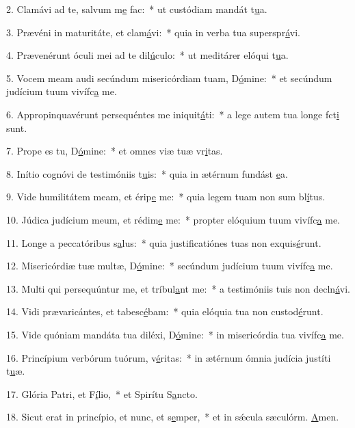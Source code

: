 2. Clamávi ad te, salvum m\uline{e} fac:~* ut custódiam mandát t\uline{u}a.\par 
3. Prævéni in maturitáte, et clam\uline{á}vi:~* quia in verba tua superspr\uline{á}vi.\par 
4. Prævenérunt óculi mei ad te dil\uline{ú}culo:~* ut meditárer elóqui t\uline{u}a.\par 
5. Vocem meam audi secúndum misericórdiam tuam, D\uline{ó}mine:~* et secúndum judícium tuum vivífc\uline{a} me.\par 
6. Appropinquavérunt persequéntes me iniquit\uline{á}ti:~* a lege autem tua longe fct\uline{i} sunt.\par 
7. Prope es tu, D\uline{ó}mine:~* et omnes viæ tuæ vr\uline{i}tas.\par 
8. Inítio cognóvi de testimóniis t\uline{u}is:~* quia in ætérnum fundást \uline{e}a.\par 
9. Vide humilitátem meam, et érip\uline{e} me:~* quia legem tuam non sum bl\uline{í}tus.\par 
10. Júdica judícium meum, et rédim\uline{e} me:~* propter elóquium tuum vivífc\uline{a} me.\par 
11. Longe a peccatóribus s\uline{a}lus:~* quia justificatiónes tuas non exquis\uline{é}runt.\par 
12. Misericórdiæ tuæ multæ, D\uline{ó}mine:~* secúndum judícium tuum vivífc\uline{a} me.\par 
13. Multi qui persequúntur me, et tríbul\uline{a}nt me:~* a testimóniis tuis non decln\uline{á}vi.\par 
14. Vidi prævaricántes, et tabesc\uline{é}bam:~* quia elóquia tua non custod\uline{é}runt.\par 
15. Vide quóniam mandáta tua diléxi, D\uline{ó}mine:~* in misericórdia tua vivífc\uline{a} me.\par 
16. Princípium verbórum tuórum, v\uline{é}ritas:~* in ætérnum ómnia judícia justíti t\uline{u}æ.\par 
17. Glória Patri, et F\uline{í}lio,~* et Spirítu S\uline{a}ncto.\par 
18. Sicut erat in princípio, et nunc, et s\uline{e}mper,~* et in sǽcula sæculórm. \uline{A}men.\par 
